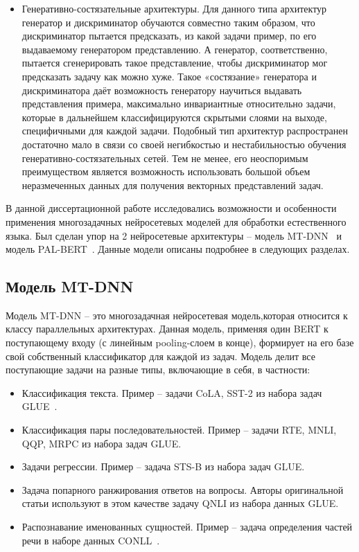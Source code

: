 \begin{itemize}
\item Генеративно-состязательные архитектуры. Для данного типа архитектур генератор и дискриминатор обучаются совместно таким образом, что дискриминатор пытается предсказать, из какой задачи пример, по его выдаваемому генератором представлению. А генератор, соответственно, пытается сгенерировать такое представление, чтобы дискриминатор мог предсказать задачу как можно хуже. Такое «состязание» генератора и дискриминатора даёт возможность генератору научиться выдавать представления примера, максимально инвариантные относительно задачи, которые в дальнейшем классифицируются скрытыми слоями на выходе, специфичными для каждой задачи. Подобный тип архитектур распространен достаточно мало в связи со своей негибкостью и нестабильностью обучения генеративно-состязательных сетей. Тем не менее, его неоспоримым преимуществом является возможность использовать большой объем неразмеченных данных для получения векторных представлений задач. 
\end{itemize}

В данной диссертационной работе исследовались возможности и особенности применения многозадачных нейросетевых моделей для обработки естественного языка. Был сделан упор на 2 нейросетевые архитектуры -- модель MT-DNN~\cite{mtdnn} и модель PAL-BERT~\cite{stickland_2019}. Данные модели описаны подробнее в следующих разделах.

\subsection{Модель MT-DNN}\label{ch:mtl:mtdnn}
Модель MT-DNN -- это многозадачная нейросетевая модель,которая относится к классу параллельных архитектурах. Данная модель, применяя один BERT к поступающему входу (с линейным pooling-слоем в конце), формирует на его базе свой собственный классификатор для каждой из задач. Модель делит все поступающие задачи на разные типы, включающие в себя, в частности:
\begin{itemize}
\item Классификация текста. Пример -- задачи CoLA, SST-2 из набора задач GLUE~\cite{wang_2018}.
\item Классификация пары последовательностей. Пример -- задачи RTE, MNLI, QQP, MRPC из набора задач GLUE. 
\item Задачи регрессии. Пример -- задача STS-B из набора задач GLUE. 
\item Задача попарного ранжирования ответов на вопросы. Авторы оригинальной статьи используют в этом качестве задачу QNLI из набора данных GLUE.
\item Распознавание именованных сущностей. Пример -- задача определения частей речи в наборе данных CONLL~\cite{sang_2003}. 
\end{itemize}

